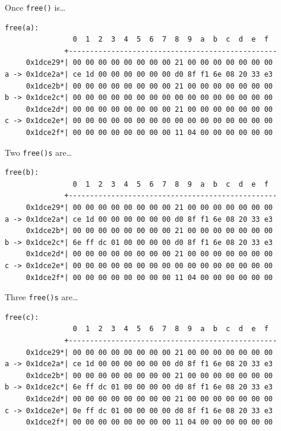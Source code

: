 \documentclass[9pt,aspectratio=169]{beamer}
\begin{document}
\begin{frame}[label={sec:org88301fa},fragile]{Once \texttt{free()} is\ldots{}}
 \begin{verbatim}
free(a):
                0  1  2  3  4  5  6  7  8  9  a  b  c  d  e  f  
              +-------------------------------------------------
     0x1dce29*| 00 00 00 00 00 00 00 00 21 00 00 00 00 00 00 00 
a -> 0x1dce2a*| ce 1d 00 00 00 00 00 00 d0 8f f1 6e 08 20 33 e3 
     0x1dce2b*| 00 00 00 00 00 00 00 00 21 00 00 00 00 00 00 00 
b -> 0x1dce2c*| 00 00 00 00 00 00 00 00 00 00 00 00 00 00 00 00 
     0x1dce2d*| 00 00 00 00 00 00 00 00 21 00 00 00 00 00 00 00 
c -> 0x1dce2e*| 00 00 00 00 00 00 00 00 00 00 00 00 00 00 00 00 
     0x1dce2f*| 00 00 00 00 00 00 00 00 11 04 00 00 00 00 00 00 
\end{verbatim}
\end{frame}
\begin{frame}[label={sec:org40c50f5},fragile]{Two \texttt{free()s} are\ldots{}}
 \begin{verbatim}
free(b):
                0  1  2  3  4  5  6  7  8  9  a  b  c  d  e  f  
              +-------------------------------------------------
     0x1dce29*| 00 00 00 00 00 00 00 00 21 00 00 00 00 00 00 00 
a -> 0x1dce2a*| ce 1d 00 00 00 00 00 00 d0 8f f1 6e 08 20 33 e3 
     0x1dce2b*| 00 00 00 00 00 00 00 00 21 00 00 00 00 00 00 00 
b -> 0x1dce2c*| 6e ff dc 01 00 00 00 00 d0 8f f1 6e 08 20 33 e3 
     0x1dce2d*| 00 00 00 00 00 00 00 00 21 00 00 00 00 00 00 00 
c -> 0x1dce2e*| 00 00 00 00 00 00 00 00 00 00 00 00 00 00 00 00 
     0x1dce2f*| 00 00 00 00 00 00 00 00 11 04 00 00 00 00 00 00 
\end{verbatim}
\end{frame}
\begin{frame}[label={sec:org8fd4eb2},fragile]{Three \texttt{free()s} are\ldots{}}
 \begin{verbatim}
free(c):
                0  1  2  3  4  5  6  7  8  9  a  b  c  d  e  f  
              +-------------------------------------------------
     0x1dce29*| 00 00 00 00 00 00 00 00 21 00 00 00 00 00 00 00 
a -> 0x1dce2a*| ce 1d 00 00 00 00 00 00 d0 8f f1 6e 08 20 33 e3 
     0x1dce2b*| 00 00 00 00 00 00 00 00 21 00 00 00 00 00 00 00 
b -> 0x1dce2c*| 6e ff dc 01 00 00 00 00 d0 8f f1 6e 08 20 33 e3 
     0x1dce2d*| 00 00 00 00 00 00 00 00 21 00 00 00 00 00 00 00 
c -> 0x1dce2e*| 0e ff dc 01 00 00 00 00 d0 8f f1 6e 08 20 33 e3 
     0x1dce2f*| 00 00 00 00 00 00 00 00 11 04 00 00 00 00 00 00 
\end{verbatim}
\end{frame}
\end{document}
